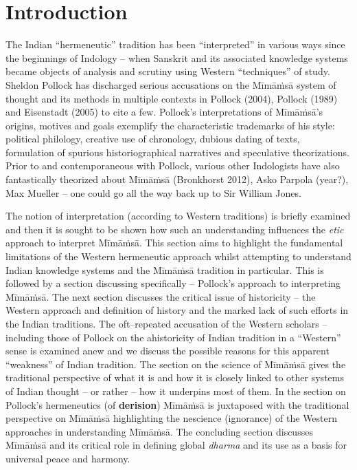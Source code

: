 \section*{Introduction}

The Indian “hermeneutic” tradition has been “interpreted” in various ways since the beginnings of Indology – when Sanskrit and its associated knowledge systems became objects of analysis and scrutiny using Western “techniques” of study. Sheldon Pollock has discharged serious accusations on the Mīmāṁsā system of thought and its methods in multiple contexts in Pollock (2004), Pollock (1989) and Eisenstadt (2005) to cite a few. Pollock’s interpretations of Mīmāṁsā’s origins, motives and goals exemplify the characteristic trademarks of his style: political philology, creative use of chronology, dubious dating of texts, formulation of spurious historiographical narratives and speculative theorizations. Prior to and contemporaneous with Pollock, various other Indologists have also fantastically theorized about Mīmāṁsā (Bronkhorst 2012), Asko Parpola (year?), Max Mueller – one could go all the way back up to Sir William Jones.

The notion of interpretation (according to Western traditions) is briefly examined and then it is sought to be shown how such an understanding influences the \textit{etic} approach to interpret Mīmāṁsā. This section aims to highlight the fundamental limitations of the Western hermeneutic approach whilst attempting to understand Indian knowledge systems and the Mīmāṁsā tradition in particular. This is followed by a section discussing specifically – Pollock’s approach to interpreting Mīmāṁsā. The next section discusses the critical issue of historicity – the Western approach and definition of history and the marked lack of such efforts in the Indian traditions. The oft–repeated accusation of the Western scholars – including those of Pollock on the ahistoricity of Indian tradition in a “Western” sense is examined anew and we discuss the possible reasons for this apparent “weakness” of Indian tradition. The section on the science of Mīmāṁsā gives the traditional perspective of what it is and how it is closely linked to other systems of Indian thought – or rather – how it underpins most of them. In the section on Pollock’s hermeneutics (of \textbf{derision}) Mīmāṁsā is juxtaposed with the traditional perspective on Mīmāṁsā highlighting the nescience (ignorance) of the Western approaches in understanding Mīmāṁsā. The concluding section discusses Mīmāṁsā and its critical role in defining global \textit{dharma} and its use as a basis for universal peace and harmony.


